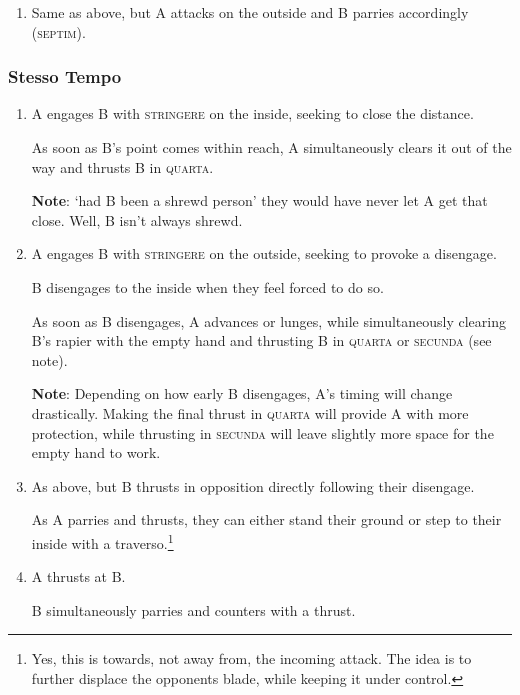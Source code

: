 \documentclass[article, 12pt, a4paper]{memoir}
\begin{document}
\begin{enumerate}
        B parries with a hanging parry (\textsc{octav}), steps forward with the back leg and grips A's forearm with their empty hand. Riposte at will.

    \item Same as above, but A attacks on the outside and B parries accordingly (\textsc{septim}).
\end{enumerate}

\subsubsection*{Stesso Tempo}
\begin{enumerate}
    \item A engages B with \textsc{stringere} on the inside, seeking to close the distance.

        As soon as B's point comes within reach, A simultaneously clears it out of the way and thrusts B in \textsc{quarta}.

        \textbf{Note}: `had B been a shrewd person' they would have never let A get that close. Well, B isn't always shrewd.

    \item A engages B with \textsc{stringere} on the outside, seeking to provoke a disengage.

        B disengages to the inside when they feel forced to do so.

        As soon as B disengages, A advances or lunges, while simultaneously clearing B's rapier with the empty hand and thrusting B in \textsc{quarta} or \textsc{secunda} (see note).

        \textbf{Note}: Depending on how early B disengages, A's timing will change drastically.
        Making the final thrust in \textsc{quarta} will provide A with more protection, while thrusting in \textsc{secunda} will leave slightly more space for the empty hand to work.

    \item As above, but B thrusts in opposition directly following their disengage.

        As A parries and thrusts, they can either stand their ground or step to their inside with a traverso.\footnote{Yes, this is towards, not away from, the incoming attack. The idea is to further displace the opponents blade, while keeping it under control.}

    \item A thrusts at B.

        B simultaneously parries and counters with a thrust.
\end{enumerate}
\end{document}
